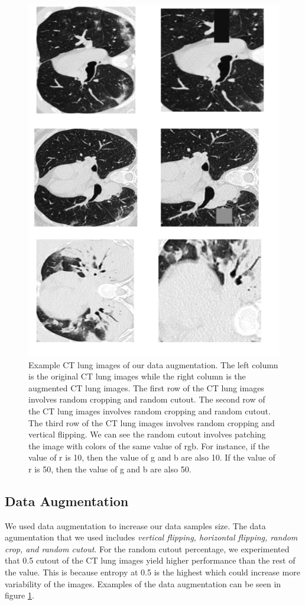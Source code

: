 \begin{figure}
	\centering
	\small
	\includegraphics[width=\linewidth]{data_aug.png}
	\caption{Example CT lung images of our data augmentation. The left column is the original CT lung images while the right column is the augmented CT lung images. The first row of the CT lung images involves random cropping and random cutout. The second row of the CT lung images involves random cropping and random cutout. The third row of the CT lung images involves random cropping and vertical flipping. We can see the random cutout involves patching the image with colors of the same value of rgb. For instance, if the value of r is 10, then the value of g and b are also 10. If the value of r is 50, then the value of g and b are also 50.}
	\label{fig:data_aug}
\end{figure}

\subsection{Data Augmentation}
We used data augmentation to increase our data samples size. The data agumentation that we used includes \textit{vertical flipping, horizontal flipping, random crop, and random cutout}. For the random cutout percentage, we experimented that 0.5 cutout of the CT lung images yield higher performance than the rest of the value. This is because entropy at 0.5 is the highest which could increase more variability of the images. Examples of the data augmentation can be seen in figure \ref{fig:data_aug}.

